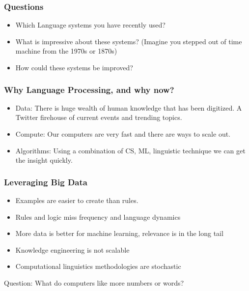 \begin{frame}[fragile]\frametitle{Questions}
  \begin{itemize}
    \item   Which Language systems you have recently used?
    \item What is impressive about these systems? (Imagine you stepped out of time machine from the 1970s or 1870s)
    \item How could these systems be improved?
  \end{itemize}
\end{frame}
  


\begin{frame}[fragile]\frametitle{Why Language Processing, and why now?}
  \begin{itemize}
    \item  Data: There is huge wealth of human knowledge that has been digitized. A Twitter firehouse of current events and trending topics.
    \item Compute: Our computers are very fast and there are ways to scale out.
    \item Algorithms: Using a combination of CS, ML, linguistic technique we can get the insight quickly.
  \end{itemize}

\end{frame}
 
\begin{frame}[fragile]\frametitle{Leveraging Big Data}
  \begin{itemize}
  \item Examples are easier to create than rules.
  \item Rules and logic miss frequency and language dynamics
  \item More data is better for machine learning, relevance is in the long tail
  \item Knowledge engineering is not scalable
  \item Computational linguistics methodologies are stochastic
  \end{itemize}
Question: What do computers like more numbers or words?
\end{frame}



